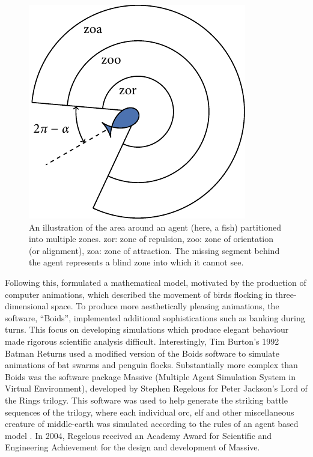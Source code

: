 \begin{figure}[t]
	\includegraphics{zonal_tikz.pdf}
	\caption{An illustration of the area around an agent (here, a fish) partitioned
	into multiple zones. zor: zone of repulsion, zoo: zone of orientation (or
	alignment), zoa: zone of attraction. The missing segment behind the agent represents a
	blind zone into which it cannot see.}
	\label{fig:zone_illustration}
\end{figure}

Following this, \textcite{reynolds87} formulated a mathematical model, motivated by the
production of computer animations, which described the movement of birds flocking in
three-dimensional space. To produce more aesthetically pleasing animations, the software,
``Boids'', implemented additional sophistications such as banking during turns. This focus
on developing simulations which produce elegant behaviour made rigorous scientific
analysis difficult. Interestingly, Tim Burton's 1992 Batman Returns used a modified
version of the Boids software to simulate animations of bat swarms and penguin flocks.
Substantially more complex than Boids was the software package Massive (Multiple Agent
Simulation System in Virtual Environment), developed by Stephen Regelous for Peter
Jackson's Lord of the Rings trilogy. This software was used to help generate the striking
battle sequences of the trilogy, where each individual orc, elf and other miscellaneous
creature of middle-earth was simulated according to the rules of an agent based model
\parencite{robbins17}. In 2004, Regelous received an Academy Award for
Scientific and Engineering Achievement for the design and development of Massive.


